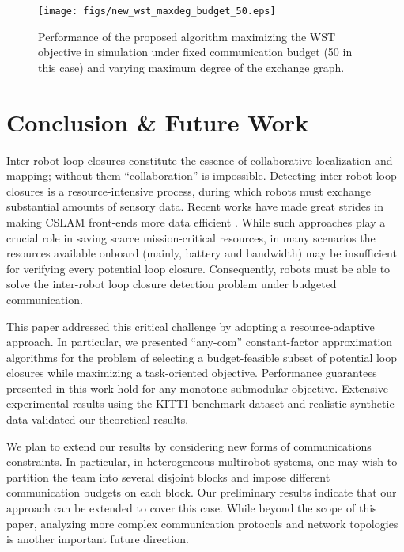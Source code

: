 \documentclass[conference]{IEEEtran}
\begin{document}
\begin{figure}[t]
\centering
\texttt{[image: figs/new\_wst\_maxdeg\_budget\_50.eps]}
\caption{\small Performance of the proposed algorithm maximizing the WST objective in simulation under fixed communication budget (50 in this case) and varying maximum degree of the exchange graph.}
\label{fig:wst_maxdeg_budget_50}
\vspace{-0.2cm}
\end{figure}

\section{Conclusion \& Future Work}
\label{sec:conclusion}
Inter-robot loop closures constitute the essence of collaborative localization
and mapping; without them ``collaboration'' is impossible. Detecting
inter-robot loop closures is a resource-intensive process, during which robots
must exchange substantial amounts of sensory data. Recent works have made great
strides in making CSLAM front-ends more data efficient
\cite{CieslewskiChoudhary17,Giamou18_ICRA}. While such approaches play a crucial role
in saving scarce mission-critical resources, in many scenarios the resources
available onboard (mainly, battery and bandwidth) may be insufficient for
verifying every potential loop closure. Consequently, robots must be able to solve
the inter-robot loop closure detection problem under budgeted communication.

This paper addressed this critical challenge by adopting a resource-adaptive
approach. In particular, we presented ``any-com'' constant-factor approximation
algorithms for the problem of selecting a budget-feasible subset of potential loop closures
while maximizing a task-oriented objective.  Performance guarantees presented in
this work hold for any monotone submodular objective.  Extensive experimental
results using the KITTI benchmark dataset and realistic synthetic data validated
our theoretical results.

We plan to extend our results by considering new forms of communications constraints.
In particular, in heterogeneous multirobot systems, one may wish to partition the team into
several disjoint blocks and impose different communication budgets on each
block. Our preliminary results indicate that our approach can be extended to
cover this case. While beyond the scope of
this paper, analyzing more complex communication protocols and network
topologies is another important future direction. 
\end{document}
